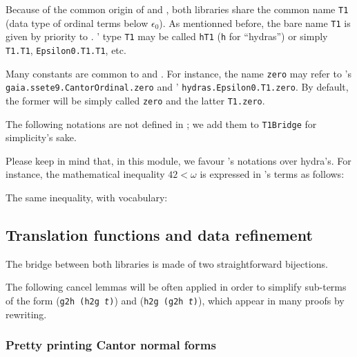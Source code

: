 Because of the common origin of \HydrasLib and \gaia, both libraries share the common name \texttt{T1} (data type of ordinal terms below $\epsilon_0$). As mentionned before, the bare name \texttt{T1} is given by priority to \gaia.
\HydrasLib' type \texttt{T1} may be called \texttt{hT1}
(\texttt{h} for ``hydras'') or simply \texttt{T1.T1}, \texttt{Epsilon0.T1.T1}, etc.



Many constants are common to \HydrasLib and \gaia. For instance, the name \texttt{zero} may refer to \gaia's
\texttt{gaia.ssete9.CantorOrdinal.zero}  and
\HydrasLib' \texttt{hydras.Epsilon0.T1.zero}. By default, the former will be simply called \texttt{zero} and the latter \texttt{T1.zero}.

The following notations are not defined in \gaia; we add them to \texttt{T1Bridge} for simplicity's sake.



\begin{remark}
Please keep in mind that, in this module, we favour \gaia's notations over hydra's.
For instance, the mathematical inequality $42<\omega$ is 
expressed in \gaia's terms as follows:


The same inequality, with \HydrasLib vocabulary:

\end{remark}

\subsection{Translation functions and data refinement}

The bridge between both libraries is made of two straightforward bijections.



The following cancel lemmas will be often applied in order to simplify sub-terms of the form (\texttt{g2h (h2g {\it t})}) and (\texttt{h2g (g2h {\it t})}), which appear in many proofs by rewriting.




\subsubsection{Pretty printing Cantor normal forms}
\label{sect:gaia-ppT1}



